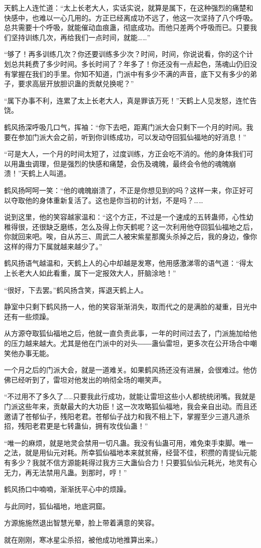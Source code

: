\begin{this_body}
天鹤上人连忙道：“太上长老大人，实话实说，就算是属下，在这种强烈的痛楚和快感中，也难以一心几用的。方正已经离成功不远了，他这一次坚持了八个呼吸。总共需要十个呼吸，就能催动血痕蛊，彻底成功。而他只差两个呼吸而已。只要我们坚持训练几次，再给我们一点时间，就能……”

“够了！再多训练几次？你还要训练多少次？时间，时间，你说说看，你的这个计划总共耗费了多少时间。多长时间了？年多了！你还没有一点起色，荡魂山仍旧没有掌握在我们的手里。你知不知道，门派中有多少不满的声音，底下又有多少的弟子，要求高层开放胆识蛊的贡献兑换呢？”

“属下办事不利，连累了太上长老大人，真是罪该万死！”天鹤上人见发怒，连忙告饶。

鹤风扬深呼吸几口气，挥袖：“你下去吧，距离门派大会只剩下一个月的时间。我要在参加门派大会之前，听到你训练成功，可以发动夺回狐仙福地的好消息！”

“可是大人，一个月的时间太短了，过度训练，方正会吃不消的。他的身体我们可以用蛊虫调理，但是强烈的快感和痛楚，会伤及魂魄，最终会令他的魂魄崩溃！”天鹤上人叫道。

鹤风扬呵呵一笑：“他的魂魄崩溃了，不正是你想见到的吗？这样一来，你正好可以夺取他的身体重新复活了。这也是你当初的计划，不是吗？……

说到这里，他的笑容越家温和：“这个方正，不过是一个速成的五转蛊师，心性幼稚得很，还很缺乏磨练，怎么及得上你天鹤呢？这一次利用他夺回狐仙福地之后，你就回来吧。唉，自从苏三、周武二人被宋紫星那魔头杀掉之后，我的身边，像你这样的得力下属就越来越少了。”

鹤风扬语气越温和，天鹤上人的心中却越是发寒，他用感激涕零的语气道：“得太上长老大人如此看重，属下一定报效大人，肝脑涂地！”

“很好，下去罢。”鹤风扬含笑，挥退天鹤上人。

静室中只剩下鹤风扬一人，他的笑容渐渐消失，取而代之的是满脸的凝重，目光中还有一些烦躁。

从方源夺取狐仙福地之后，他就一直负责此事，一年的时间过去了，门派施加给他的压力越来越大。尤其是他在门派中的对头――蛊仙雷坦，更多次在公开场合中嘲笑他办事无能。

一个月之后的门派大会，就是一道难关。如果鹤风扬还没有进展，会很难过。他仿佛已经听到了，雷坦对他发出的响彻全场的嘲笑声。

“不过用不了多久了……只要我此行成功，就能让雷坦这些小人都统统闭嘴。我就是门派这些年来，贡献最大的大功臣！这一次攻略狐仙福地，我会亲自出动。而且还邀请了苍郁仙子，残阳老君。苍郁仙子战力和我不相上下，掌握至少三道凡道杀招，残阳老君更是七转蛊仙，拥有攻伐仙蛊！”

“唯一的麻烦，就是地灵会禁用一切凡蛊。我没有仙蛊可用，难免束手束脚。唯一之法，就是用仙元对耗。所幸狐仙福地本来就贫瘠，经营不佳，积攒的青提仙元能有多少？我就不信方源能耗得过我方三大蛊仙合力！只要狐仙仙元耗光，地灵有心无力，再无法禁用凡蛊。到那时，哼！”

鹤风扬口中喃喃，渐渐抚平心中的烦躁。

与此同时，狐仙福地，地底洞窟。

方源施施然退出智慧光晕，脸上带着满意的笑容。

就在刚刚，寒冰星尘杀招，被他成功地推算出来。）

\end{this_body}

